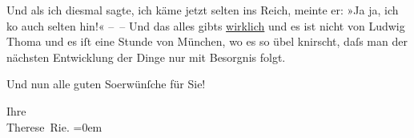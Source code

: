 \pstart
           Und als ich diesmal sagte, ich käme jetzt selten ins Reich, meinte er: »Ja ja, ich ko{\geminationm} auch selten
               hin!« – – Und das alles gibts \uline{wirklich} und es ist
               nicht von Ludwig Thoma und es iſt eine Stunde
               von München, wo {\pb}es so
               übel knirscht, daſs man der nächsten Entwicklung der Dinge nur mit Besorgnis
               folgt.\pend
           
\pstart
           Und nun alle guten So{\geminationm}erwünſche für Sie!\pend
           
\pstart
           Ihre{\\[\baselineskip]}\spacefill\mbox{Therese Rie.}\pend
           \leftskip=0em{}\endnumbering{}  \newcommand{\dateiname}{L02573}\newcommand{\titel}{Therese Rie-Andro an Arthur Schnitzler, [Anfang Juli 1923]}\newcommand{\editorInnen}{Martin Anton Müller und Gerd-Hermann Susen}
